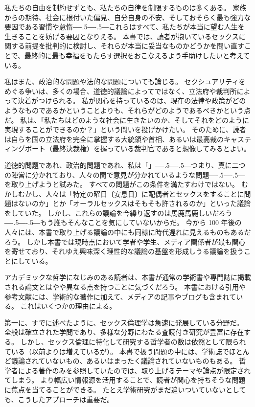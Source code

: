 \documentclass[paper=a4,book,openany]{jlreq}
\def\DDASH{―\kern-.5\zw―\kern-.5\zw―} %
\begin{document}
私たちの自由を制約せずとも、私たちの自律を制限するものは多くある。
家族からの期待、社会に根付いた偏見、自分自身の不安、そしておそらく最も強力な要因である習慣や怠惰{\DDASH}これらはすべて、私たちが本当に望む人生を生きることを妨げる要因となりえる。
本書では、読者が抱いているセックスに関する前提を批判的に検討し、それらが本当に妥当なものかどうかを問い直すことで、最終的に最も幸福をもたらす選択をおこなえるよう手助けしたいと考えている。

私はまた、政治的な問題や法的な問題についても論じる。
セクシュアリティをめぐる争いは、多くの場合、道徳的議論によってではなく、立法府や裁判所によって決着がつけられる。
私が関心を持っているのは、現在の法律や政策がどのようなものであるかということよりも、それらがどのようであるべきかという点だ。
私は、「私たちはどのような社会に生きたいのか、そしてそれをどのように実現することができるのか？」という問いを投げかけたい。
そのために、読者は自らを国の立法府を完全に掌握する大統領や首相、あるいは最高裁のキャスティングボート（最終決裁権）を握っている裁判官であると想像してみるとよい。

道徳的問題であれ、政治的問題であれ、私は「」{\DDASH}つまり、真に二つの陣営に分かれており、人々の間で意見が分かれているような問題{\DDASH}を取り上げようと試みた。
すべての問題がこの条件を満たすわけではない。
むかしむかし、人々は「特定の曜日〔安息日〕に配偶者とセックスをすることに問題はないのか」とか「オーラルセックスはそもそも許されるのか」といった議論をしていた。
しかし、これらの議論を今繰り返すのは馬鹿馬鹿しいだろう{\DDASH}もう誰もそんなことを気にしていないからだ。
今から 100 年後の人々には、本書で取り上げる議論の中にも同様に時代遅れに見えるものもあるだろう。
しかし本書では現時点において学者や学生、メディア関係者が最も関心を寄せており、それゆえ興味深く理性的な議論の基盤を形成しうる議論を扱うことにしている。

アカデミックな哲学になじみのある読者は、本書が通常の学術書や専門誌に掲載される論文とはやや異なる点を持つことに気づくだろう。
本書における引用や参考文献には、学術的な著作に加えて、メディアの記事やブログも含まれている。
これはいくつかの理由による。

第一に、すでに述べたように、セックス倫理学は急速に発展している分野だ。
全般は確立された学問であり、多様な分野にわたる査読付き研究が豊富に存在する。
しかし、セックス倫理に特化して研究する哲学者の数は依然として限られている（以前よりは増えているが）。
本書で扱う問題の中には、学術誌でほとんど議論されていないもの、あるいはまったく議論されていないものもある。
哲学者による著作のみを参照していたのでは、取り上げるテーマや論点が限定されてしまう。
より幅広い情報源を活用することで、読者が関心を持ちそうな問題に焦点を当てることができる。
たとえ学術研究がまだ追いついていないとしても、こうしたアプローチは重要だ。
\end{document}
